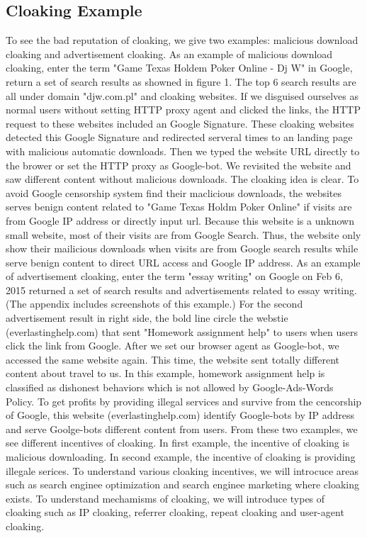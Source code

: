 \subsection{Cloaking Example}
To see the bad reputation of cloaking, we give two examples: malicious download cloaking and advertisement cloaking. As an example of malicious download cloaking, enter the term "Game Texas Holdem Poker Online - Dj W" in Google, return a set of search results as showned in figure 1.
The top 6 search results are all under domain "djw.com.pl" and cloaking websites. If we disguised ourselves as normal users without setting HTTP proxy agent and clicked the links, the HTTP request 
to these websites included an Google Signature. These cloaking websites detected this Google Signature and redirected serveral times to an landing page with malicious automatic downloads. Then we 
typed the website URL directly to the brower or set the HTTP proxy as Google-bot. We revisited the website and saw different content without malicious downloads. The cloaking idea is clear. To avoid Google censorship system find their maclicious downloads, the websites serves benign content related to "Game Texas Holdm Poker Online" if visits are from Google IP address or directly input url. Because this website is a unknown small website, most of their visits are from Google Search. Thus, the website only show their mailicious downloads when visits are from Google search results while serve benign content to direct URL access and Google IP address. 
As an example of advertisement cloaking, enter the term "essay writing" on Google on Feb 6, 2015 returned a set of search results and advertisements related to essay writing. (The appendix includes screenshots of this example.) For the second advertisement result in right side, the bold line circle the webstie (everlastinghelp.com) that sent "Homework assignment help" to users when users click the link from Google. After we set our browser agent as Google-bot, we accessed the same website again. This time, the website sent totally different content about travel to us. In this example, homework assignment help is classified as dishonest behaviors which is not allowed by Google-Ads-Words Policy. To get profits by providing illegal services and survive from the cencorship of Google, this website (everlastinghelp.com) identify Google-bots by IP address and serve Goolge-bots different content  from users. 
From these two examples, we see different incentives of cloaking. In first example, the incentive of cloaking is malicious downloading. In second example, the incentive of cloaking is providing 
illegale serices. To understand various cloaking incentives, we will introcuce areas such as search enginee optimization and search enginee marketing where cloaking exists. To understand 
mechamisms of cloaking, we will introduce types of cloaking such as IP cloaking, referrer cloaking, repeat cloaking and user-agent cloaking. 


